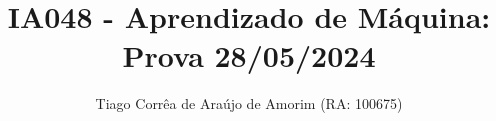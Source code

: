 \documentclass[final,3p]{elsarticle}
\numberwithin{equation}{section}
\begin{document}
\begin{frontmatter}



\title{IA048 - Aprendizado de Máquina: Prova 28/05/2024}


\author{Tiago Corrêa de Araújo de Amorim (RA: 100675)}





\end{frontmatter}
\end{document}
